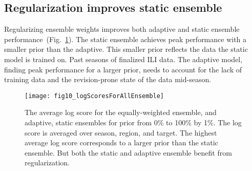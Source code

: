 \documentclass[sagev,times,Review,10pt]{sagej}
\def\adaptOver{\textbf{adaptive$_{\text{over}}$ }}
\begin{document}
\begin{appendix}
\begin{table}[ht!]
\caption{
Random effects regressions compared log scores between the \adaptOver vs equally-weighted and \adaptOver vs static ensembles.
The model included an intercept, and separate random effect for: season, region, and target.
The dependent variables is the difference in log scores paired by season-region-target-epidemic week.
Conditional mean, 95\%CI, asymptotic, and a permutation based p-value are reported.}

\end{table}

\clearpage

\section{Regularization improves static ensemble}

Regularizing ensemble weights improves both adaptive and static ensemble performance~(Fig.~\ref{fig.staticHelp}). 
The static ensemble achieves peak performance with a smaller prior than the adaptive.
This smaller prior reflects the data the static model is trained on. 
Past seasons of finalized ILI data. 
The adaptive model, finding peak performance for a larger prior, needs to account for the lack of training data and the revision-prone state of the data mid-season.

\graphicspath{{../../../_6_TLGs/_G/fig10_logScoresForAllEnsembles/}}
\begin{figure}[ht!]
    \centering
    \texttt{[image: fig10\_logScoresForAllEnsemble]}
    \caption{The average log score for the equally-weighted ensemble, and adaptive, static ensembles for prior from 0\% to 100\% by 1\%.
    The log score is averaged over season, region, and target.
    The highest average log score corresponds to a larger prior than the static ensemble. But both the static and adaptive ensemble benefit from regularization.\label{fig.staticHelp}}
\end{figure}

\clearpage

\end{appendix}
\end{document}

